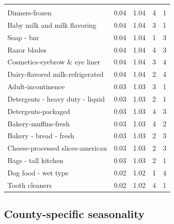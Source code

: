 \documentclass[]{article}
\begin{document}
\begin{table}
\begin{tabular}[t]{lrrrr}
\addlinespace[0.3em]
\multicolumn{5}{l}{\textbf{Lowest $SR_p$}}\\
\hspace{1em}Dinners-frozen & 0.04 & 1.04 & 4 & 1\\
\hspace{1em}Baby milk and milk flavoring & 0.04 & 1.04 & 3 & 1\\
\hspace{1em}Soap - bar & 0.04 & 1.04 & 1 & 3\\
\hspace{1em}Razor blades & 0.04 & 1.04 & 4 & 3\\
\hspace{1em}Cosmetics-eyebrow \& eye liner & 0.04 & 1.04 & 3 & 4\\
\hspace{1em}Dairy-flavored milk-refrigerated & 0.04 & 1.04 & 2 & 4\\
\hspace{1em}Adult-incontinence & 0.03 & 1.03 & 3 & 1\\
\hspace{1em}Detergents - heavy duty - liquid & 0.03 & 1.03 & 2 & 1\\
\hspace{1em}Detergents-packaged & 0.03 & 1.03 & 4 & 3\\
\hspace{1em}Bakery-muffins-fresh & 0.03 & 1.03 & 4 & 2\\
\hspace{1em}Bakery - bread - fresh & 0.03 & 1.03 & 2 & 3\\
\hspace{1em}Cheese-processed slices-american & 0.03 & 1.03 & 2 & 3\\
\hspace{1em}Bags - tall kitchen & 0.03 & 1.03 & 2 & 1\\
\hspace{1em}Dog food - wet type & 0.02 & 1.02 & 1 & 4\\
\hspace{1em}Tooth cleaners & 0.02 & 1.02 & 4 & 1\\
\bottomrule
\end{tabular}
\end{table}

\subsection{County-specific
seasonality}\label{county-specific-seasonality}
\end{document}
